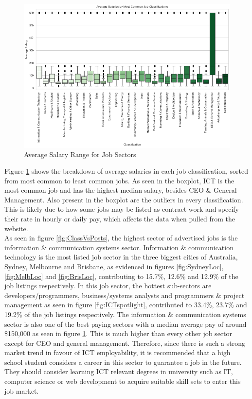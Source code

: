 \documentclass[twoside, 12pt, a4paper]{article}
\begin{document}
\newpage
\begin{figure}[h]
	\centering
	\includegraphics[scale = 0.50]{SectorAvgSalBox.png}
	\caption{Average Salary Range for Job Sectors}
	\label{fig:AvgSalBox}
\end{figure}

Figure \ref{fig:AvgSalBox} shows the breakdown of average salaries in each job classification, sorted from most common to least common jobs. As seen in the boxplot, ICT is the most common job and has the highest median salary, besides CEO \& General Management. Also present in the boxplot are the outliers in every classification. This is likely due to how some jobs may be listed as contract work and specify their rate in hourly or daily pay, which affects the data when pulled from the website.\\

As seen in figure \ref{fig:ClassVsPosts}, the highest sector of advertised jobs is the information \& communication systems sector. Information \& communication technology is the most listed job sector in the three biggest cities of Australia, Sydney, Melbourne and Brisbane, as evidenced in figures \ref{fig:SydneyLoc}, \ref{fig:MelbLoc} and \ref{fig:BrisLoc}, contributing to 15.7\%, 12.6\% and 12.9\% of the job listings respectively. In this job sector, the hottest sub-sectors are developers/programmers, business/systems analysts and programmers \& project management as seen in figure \ref{fig:ICTspotlight}, contributed to 33.4\%, 23.7\% and 19.2\% of the job listings respectively. The information \& communication systems sector is also one of the best paying sectors with a median average pay of around \$150,000 as seen in figure \ref{fig:AvgSalBox}. This is much higher than every other job sector except for CEO and general management. Therefore, since there is such a strong market trend in favour of ICT employability, it is recommended that a high school student considers a career in this sector to guarantee a job in the future. They should consider learning ICT relevant degrees in university such as IT, computer science or web development to acquire suitable skill sets to enter this job market. 
\end{document}
